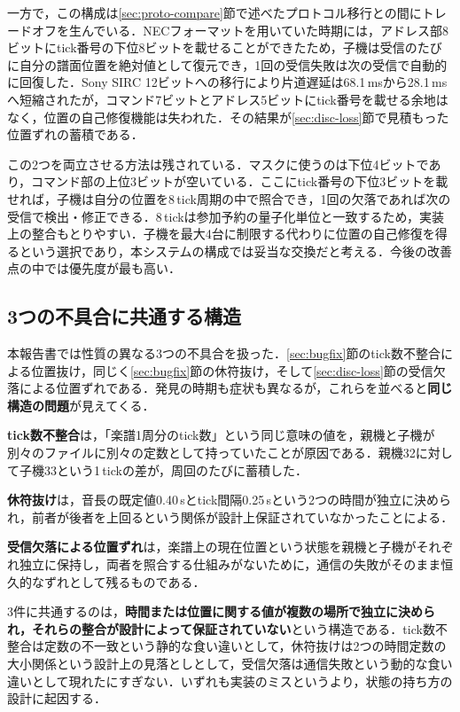 \documentclass[uplatex,dvipdfmx]{jlreq}
\begin{document}
一方で，この構成は\ref{sec:proto-compare}節で述べたプロトコル移行との間にトレードオフを生んでいる．NECフォーマットを用いていた時期には，アドレス部8ビットにtick番号の下位8ビットを載せることができたため，子機は受信のたびに自分の譜面位置を絶対値として復元でき，1回の受信失敗は次の受信で自動的に回復した．Sony SIRC 12ビットへの移行により片道遅延は68.1\,msから28.1\,msへ短縮されたが，コマンド7ビットとアドレス5ビットにtick番号を載せる余地はなく，位置の自己修復機能は失われた．その結果が\ref{sec:disc-loss}節で見積もった位置ずれの蓄積である．

この2つを両立させる方法は残されている．マスクに使うのは下位4ビットであり，コマンド部の上位3ビットが空いている．ここにtick番号の下位3ビットを載せれば，子機は自分の位置を8\,tick周期の中で照合でき，1回の欠落であれば次の受信で検出・修正できる．8\,tickは参加予約の量子化単位と一致するため，実装上の整合もとりやすい．子機を最大4台に制限する代わりに位置の自己修復を得るという選択であり，本システムの構成では妥当な交換だと考える．今後の改善点の中では優先度が最も高い．

\subsection{3つの不具合に共通する構造}
\label{sec:disc-root}

本報告書では性質の異なる3つの不具合を扱った．\ref{sec:bugfix}節のtick数不整合による位置抜け，同じく\ref{sec:bugfix}節の休符抜け，そして\ref{sec:disc-loss}節の受信欠落による位置ずれである．発見の時期も症状も異なるが，これらを並べると\textbf{同じ構造の問題}が見えてくる．

\textbf{tick数不整合}は，「楽譜1周分のtick数」という同じ意味の値を，親機と子機が別々のファイルに別々の定数として持っていたことが原因である．親機32に対して子機33という1\,tickの差が，周回のたびに蓄積した．

\textbf{休符抜け}は，音長の既定値0.40\,sとtick間隔0.25\,sという2つの時間が独立に決められ，前者が後者を上回るという関係が設計上保証されていなかったことによる．

\textbf{受信欠落による位置ずれ}は，楽譜上の現在位置という状態を親機と子機がそれぞれ独立に保持し，両者を照合する仕組みがないために，通信の失敗がそのまま恒久的なずれとして残るものである．

3件に共通するのは，\textbf{時間または位置に関する値が複数の場所で独立に決められ，それらの整合が設計によって保証されていない}という構造である．tick数不整合は定数の不一致という静的な食い違いとして，休符抜けは2つの時間定数の大小関係という設計上の見落としとして，受信欠落は通信失敗という動的な食い違いとして現れたにすぎない．いずれも実装のミスというより，状態の持ち方の設計に起因する．
\end{document}
